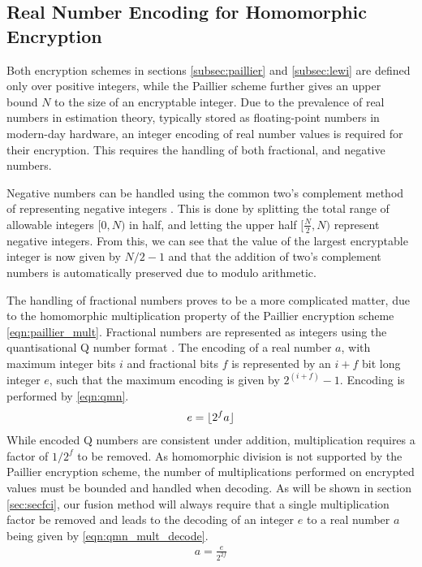 \documentclass[letterpaper, 10 pt, conference]{ieeeconf}  %
\begin{document}
\subsection{Real Number Encoding for Homomorphic Encryption}
Both encryption schemes in sections \ref{subsec:paillier} and \ref{subsec:lewi} are defined only over positive integers, while the Paillier scheme further gives an upper bound $N$ to the size of an encryptable integer. Due to the prevalence of real numbers in estimation theory, typically stored as floating-point numbers in modern-day hardware, an integer encoding of real number values is required for their encryption. This requires the handling of both fractional, and negative numbers. 

Negative numbers can be handled using the common two's complement method of representing negative integers \cite{liljaDesigningDigitalComputer}. This is done by splitting the total range of allowable integers $[0, N)$ in half, and letting the upper half $[\frac{N}{2}, N)$ represent negative integers. From this, we can see that the value of the largest encryptable integer is now given by $N/2-1$ and that the addition of two's complement numbers is automatically preserved due to modulo arithmetic.
   
The handling of fractional numbers proves to be a more complicated matter, due to the homomorphic multiplication property of the Paillier encryption scheme \eqref{eqn:paillier_mult}. Fractional numbers are represented as integers using the quantisational Q number format \cite{oberstarFixedPointRepresentationFractional}. The encoding of a real number $a$, with maximum integer bits $i$ and fractional bits $f$ is represented by an $i+f$ bit long integer $e$, such that the maximum encoding is given by $2^{(i+f)}-1$. Encoding is performed by \eqref{eqn:qmn}.
\begin{gather}
   e = \lfloor{2^f a}\rfloor \label{eqn:qmn}
\end{gather}
While encoded Q numbers are consistent under addition, multiplication requires a factor of $1/2^f$ to be removed. As homomorphic division is not supported by the Paillier encryption scheme, the number of multiplications performed on encrypted values must be bounded and handled when decoding. As will be shown in section \ref{sec:secfci}, our fusion method will always require that a single multiplication factor be removed and leads to the decoding of an integer $e$ to a real number $a$ being given by \eqref{eqn:qmn_mult_decode}.
\begin{gather}
   a = \frac{e}{2^{2f}} \label{eqn:qmn_mult_decode}
\end{gather}
\end{document}
